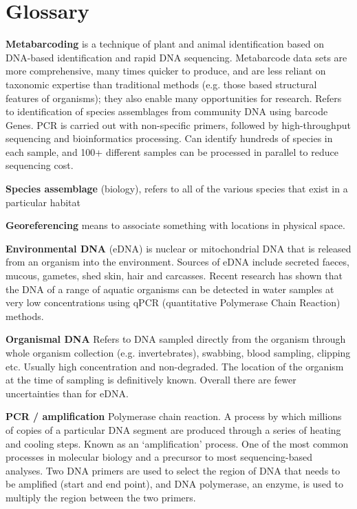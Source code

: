 \chapter{Glossary}
\textbf{Metabarcoding} is a technique of plant and animal identification based on DNA-based identification and rapid DNA sequencing. Metabarcode data sets are more comprehensive, many times quicker to produce, and are less reliant on taxonomic expertise than traditional methods (e.g. those based structural features of organisms); they also enable many opportunities for research.
Refers to identification of species assemblages from community DNA using barcode Genes. PCR is carried out with non-specific primers, followed by high-throughput sequencing and bioinformatics processing. Can identify hundreds of species in each sample, and 100+ different samples can be processed in parallel to reduce sequencing cost.

\textbf{Species assemblage }(biology), refers to all of the various species that exist in a particular habitat

\textbf{Georeferencing} means to associate something with locations in physical space.

\textbf{Environmental DNA} (eDNA) is nuclear or mitochondrial DNA that is released from an organism into the environment. Sources of eDNA include secreted faeces, mucous, gametes, shed skin, hair and carcasses. Recent research has shown that the DNA of a range of aquatic organisms can be detected in water samples at very low concentrations using qPCR (quantitative Polymerase Chain Reaction) methods.

\textbf{Organismal DNA}
Refers to DNA sampled directly from the organism through whole organism collection (e.g. invertebrates), swabbing, blood sampling, clipping etc. Usually high concentration and non-degraded. The location of the organism at the time of sampling is definitively known. Overall there are fewer uncertainties than for eDNA.

\textbf{PCR / amplification}
Polymerase chain reaction. A process by which millions of copies of a particular DNA segment are produced through a series of heating and cooling steps. Known as an ‘amplification’ process. One of the most common processes in molecular biology and a precursor to most sequencing-based analyses. Two DNA primers are used to select the region of DNA that needs to be amplified (start and end point), and DNA polymerase, an enzyme, is used to multiply the region between the two primers.


